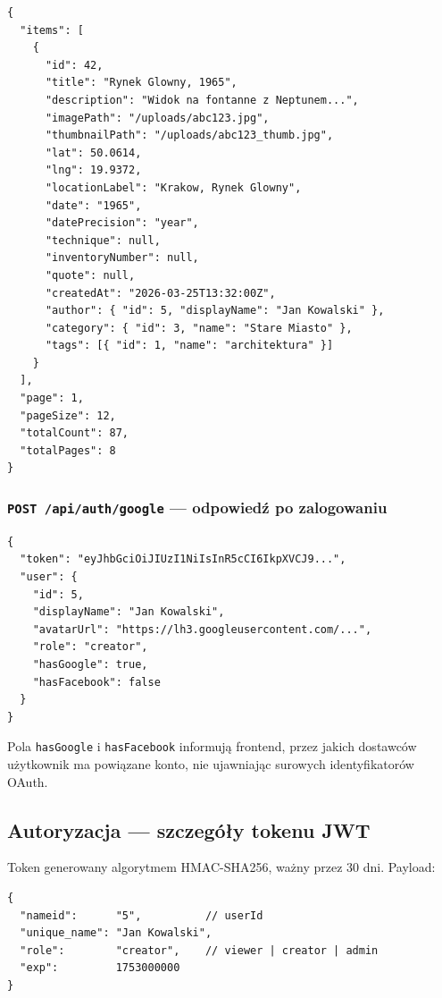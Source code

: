 \documentclass[12pt, a4paper]{article}
\begin{document}
\begin{lstlisting}[style=plain, caption={Odpowiedź GET /api/photos}]
{
  "items": [
    {
      "id": 42,
      "title": "Rynek Glowny, 1965",
      "description": "Widok na fontanne z Neptunem...",
      "imagePath": "/uploads/abc123.jpg",
      "thumbnailPath": "/uploads/abc123_thumb.jpg",
      "lat": 50.0614,
      "lng": 19.9372,
      "locationLabel": "Krakow, Rynek Glowny",
      "date": "1965",
      "datePrecision": "year",
      "technique": null,
      "inventoryNumber": null,
      "quote": null,
      "createdAt": "2026-03-25T13:32:00Z",
      "author": { "id": 5, "displayName": "Jan Kowalski" },
      "category": { "id": 3, "name": "Stare Miasto" },
      "tags": [{ "id": 1, "name": "architektura" }]
    }
  ],
  "page": 1,
  "pageSize": 12,
  "totalCount": 87,
  "totalPages": 8
}
\end{lstlisting}

\subsubsection{\texttt{POST /api/auth/google} --- odpowiedź po zalogowaniu}

\begin{lstlisting}[style=plain, caption={Odpowiedź POST /api/auth/google}]
{
  "token": "eyJhbGciOiJIUzI1NiIsInR5cCI6IkpXVCJ9...",
  "user": {
    "id": 5,
    "displayName": "Jan Kowalski",
    "avatarUrl": "https://lh3.googleusercontent.com/...",
    "role": "creator",
    "hasGoogle": true,
    "hasFacebook": false
  }
}
\end{lstlisting}

Pola \texttt{hasGoogle} i \texttt{hasFacebook} informują frontend, przez jakich dostawców
użytkownik ma powiązane konto, nie ujawniając surowych identyfikatorów OAuth.

\subsection{Autoryzacja — szczegóły tokenu JWT}

Token generowany algorytmem HMAC-SHA256, ważny przez 30 dni. Payload:

\begin{lstlisting}[style=plain, caption={Payload tokenu JWT}]
{
  "nameid":      "5",          // userId
  "unique_name": "Jan Kowalski",
  "role":        "creator",    // viewer | creator | admin
  "exp":         1753000000
}
\end{lstlisting}
\end{document}
